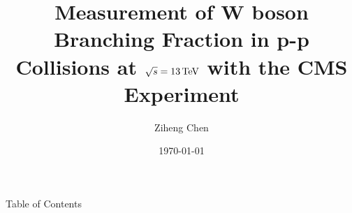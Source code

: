 \documentclass[xcolor=dvipsnames, 10pt]{beamer}
\title[\BWl measurement]{Measurement of W boson Branching Fraction in p-p Collisions at $\sqrt{s} = 13\,\text{Te\hspace{-.08em}V}$  with the CMS Experiment}
\date{\today}
\author[Z. Chen]{Ziheng Chen}
\institute[NWU]{Department of Physics and Astronomy, \\ Northwestern University}
\begin{document}
\begin{frame}{} \titlepage \end{frame}
\begin{frame}{Table of Contents}\setcounter{tocdepth}{2}\tableofcontents \end{frame}

% 
% 
% 

\begin{frame}[allowframebreaks]
    \tiny{
    
    
    }
\end{frame}
\end{document}
